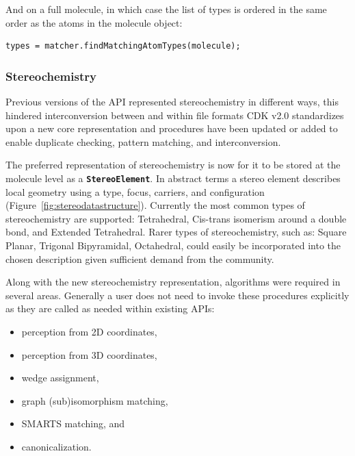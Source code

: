 \documentclass[doublespacing]{bmcart}
\def \cdkversion {v2.0}
\begin{document}
And on a full molecule, in which case the list of types is ordered in the same
order as the atoms in the molecule object:

\vspace{0.2cm}
\begin{verbatim}
types = matcher.findMatchingAtomTypes(molecule);
\end{verbatim}
\vspace{0.2cm}

  \subsubsection*{Stereochemistry}

  Previous versions of the API represented stereochemistry in different ways, this hindered
  interconversion between and within file formats CDK \cdkversion{} standardizes
  upon a new core representation and procedures have been updated or added to
  enable duplicate checking, pattern matching, and interconversion.

  The preferred representation of stereochemistry is now for it to be stored at the molecule
  level as a \texttt{\textbf{StereoElement}}. In abstract terms a stereo element describes local
  geometry using a type, focus, carriers, and configuration (Figure~\ref{fig:stereodatastructure}).
  Currently the most common types of stereochemistry are supported: Tetrahedral, Cis-trans isomerism 
  around a double bond, and Extended Tetrahedral. Rarer types of stereochemistry, such as: Square 
  Planar, Trigonal Bipyramidal, Octahedral, could easily be incorporated into the chosen description 
   given sufficient demand from the community.


  Along with the new stereochemistry representation, algorithms were required in several areas. Generally
  a user does not need to invoke these procedures explicitly as they are called as needed within existing
  APIs:

\vspace{0.2cm}
  \begin{itemize}
   \item perception from 2D coordinates,
   \item perception from 3D coordinates,
   \item wedge assignment,
   \item graph (sub)isomorphism matching,
   \item SMARTS matching, and
   \item canonicalization.
  \end{itemize}
\vspace{0.2cm}
\end{document}
